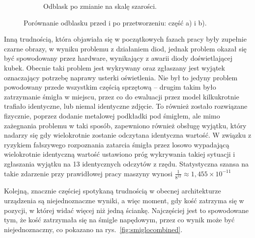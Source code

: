 \begin{figure}[H]
\begin{subfigure}[t]{0.45\linewidth}
        \caption{Odblask po zmianie na skalę szarości.}
        \label{fig:blaskproc}
    \end{subfigure}
    \caption{Porównanie odblasku przed i po przetworzeniu: część a) i b).}
    \label{fig:blaskcombined}
\end{figure}


Inną trudnością, która objawiała się w początkowych fazach pracy były zupełnie czarne obrazy,
w wyniku problemu z działaniem diod, jednak problem okazał się być spowodowany przez hardware, wynikający z awarii diody doświetlającej kubek.
Obecnie taki problem jest wykrywany oraz zgłaszany jest wyjątek oznaczający potrzebę naprawy usterki oświetlenia.
Nie był to jedyny problem powodowany przede wszystkim częścią sprzętową -- drugim takim było zatrzymanie śmigła w miejscu,
przez co do ewaluacji przez model kilkukrotnie trafiało identyczne, lub niemal identyczne zdjęcie.
To również zostało rozwiązane fizycznie, poprzez dodanie metalowej podkładki pod śmigłem,
ale mimo zażegnania problemu w taki sposób, zapewniono również obsługę wyjątku, który nadarzy się gdy wielokrotnie zostanie odczytana identyczna wartość.
W związku z ryzykiem fałszywego rozpoznania zatarcia śmigła przez losowo wypadającą wielokrotnie identyczną wartość ustawiono próg wykrywania takiej sytuacji i zgłaszania wyjątku na 13 identycznych odczytów z rzędu.
Statystyczna szansa na takie zdarzenie przy prawidłowej pracy maszyny wynosi
$\frac{1}{8^{12}} \approx 1{,}455 \times 10^{-11}$

Kolejną, znacznie częściej spotykaną trudnością w obecnej architekturze urządzenia są niejednoznaczne wyniki,
a więc moment, gdy kość zatrzyma się w pozycji, w której widać więcej niż jedną ściankę.
Najczęściej jest to spowodowane tym, że kość zatrzymała się na śmigle napędowym,
przez co wynik może być niejednoznaczny, co pokazano na rys.~\ref{fig:smiglocombined}.

